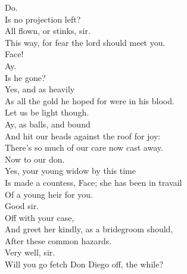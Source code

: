 \documentclass[a4paper,oneside,12pt]{memoir}
\begin{document}
\begin{drama*}
\mammonspeaks {} Do.\\
Is no projection left?\\
\facespeaks {} All flown, or stinks, sir.\\
This way, for fear the lord should meet you.\\
\subtlespeaks {}  Face!\\
\facespeaks Ay.\\
\subtlespeaks {} Is he gone?\\
\facespeaks {} Yes, and as heavily\\
As all the gold he hoped for were in his blood.\\
Let us be light though.\\
\subtlespeaks {}  Ay, as balls, and bound\\
And hit our heads against the roof for joy:\\
There's so much of our care now cast away.\\
\facespeaks Now to our don.\\
\subtlespeaks {} Yes, your young widow by this time\\
Is made a countess, Face; she has been in travail\\
Of a young heir for you.\\
\facespeaks {} Good sir.\\
\subtlespeaks {} Off with your case,\\
And greet her kindly, as a bridegroom should,\\
After these common hazards.\\
\facespeaks {} Very well, sir.\\
Will you go fetch Don Diego off, the while?\\
\scene


\end{drama*}
\end{document}
